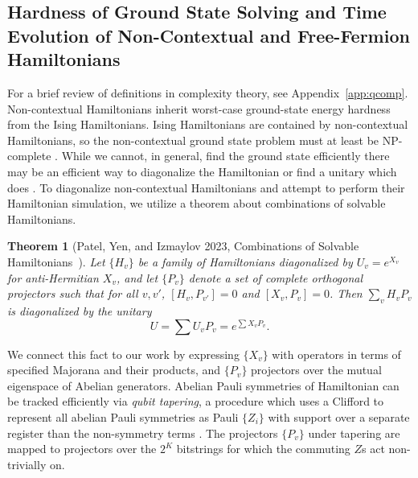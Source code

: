 \documentclass[%
 aip,
 amsmath,amssymb,
 reprint,%
]{revtex4-1}
\newtheorem{theorem}{Theorem}
\begin{document}

\subsection{Hardness of Ground State Solving and Time Evolution of Non-Contextual and Free-Fermion Hamiltonians}\label{sec:hardness}

\indent For a brief review of definitions in complexity theory, see Appendix~\ref{app:qcomp}. Non-contextual Hamiltonians inherit worst-case ground-state energy hardness from the Ising Hamiltonians. Ising Hamiltonians are contained by non-contextual Hamiltonians, so the non-contextual ground state problem must at least be $\mathrm{NP}$-complete \cite{Kirby_ContextClassic}. While we cannot, in general, find the ground state efficiently there may be an efficient way to diagonalize the Hamiltonian or find a unitary which does \cite{patel2023extensionexactlysolvablehamiltoniansusing}. To diagonalize non-contextual Hamiltonians and attempt to perform their Hamiltonian simulation, we utilize a theorem about combinations of solvable Hamiltonians.

\begin{theorem}[Patel, Yen, and Izmaylov 2023, Combinations of Solvable Hamiltonians~\cite{patel2023extensionexactlysolvablehamiltoniansusing}]
    Let $\{H_v\}$ be a family of Hamiltonians diagonalized by $U_v = e^{X_v}$ for anti-Hermitian $X_v$, and let $\{P_v\}$ denote a set of complete orthogonal projectors such that for all $v,v'$, $[H_v, P_{v'}] = 0$ and $[X_v, P_v] = 0$. Then $\sum_v H_v P_v$ is diagonalized by the unitary 
    \begin{equation}
        U = \sum U_v P_v = e^{\sum X_v P_v}.
        \label{eq:projector-diagonalization-unitary}
    \end{equation} 
\end{theorem}
We connect this fact to our work by expressing $\{X_v\}$ with operators in terms of specified Majorana and their products, and $\{P_v\}$ projectors over the mutual eigenspace of Abelian generators. Abelian Pauli symmetries of Hamiltonian can be tracked efficiently via {\it qubit tapering}, a procedure which uses a Clifford to represent all abelian Pauli symmetries as Pauli $\{Z_i\}$ with support over a separate register than the non-symmetry terms \cite{bravyi2017taperingqubitssimulatefermionic}. The projectors $\{P_v\}$ under tapering are mapped to projectors over the $2^K$ bitstrings for which the commuting $Z$s act non-trivially on. \\
\end{document}
